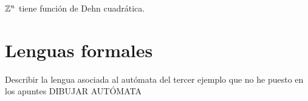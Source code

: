 \documentclass[twoside]{article}
\begin{document}
\newpage

\begin{ejercicio}{3.2}
$\mathbb{Z}^n$ tiene función de Dehn cuadrática. 
\end{ejercicio}
\begin{solucion}
\end{solucion}

\newpage

\section{Lenguas formales}

\begin{ejercicio}{4.1}
Describir la lengua asociada al autómata del tercer ejemplo que no he puesto en los apuntes DIBUJAR AUTÓMATA
\end{ejercicio}
\begin{solucion}

\end{solucion}
\end{document}
